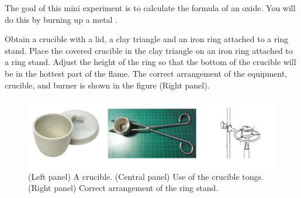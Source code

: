 \documentclass[main.tex]{subfiles}
\begin{document}
\begin{fullwidth}
\vspace{0.2cm}{\large \bfseries 1. Empirical formula of an oxyde}
The goal of this mini experiment is to calculate the formula of an oxide. You will do this by burning up a metal .
\begin{steps}
      \newstep[] Obtain a crucible with a lid, a clay triangle and an iron ring attached to a ring stand. Place the covered crucible in the clay triangle on an iron ring attached to a ring stand. Adjust the height of the ring so that the bottom of the crucible will be in the hottest part of the flame. The correct arrangement of the equipment, crucible, and burner is shown in the figure (Right panel).   
     


\begin{figure}[h] %
        \includegraphics[width=\linewidth,scale=0.3]{./chapter5/formu.png}
\caption{(Left panel) A crucible. (Central panel) Use of the crucible tongs. (Right panel) Correct arrangement of the ring stand.}\label{fig:reactions}
\end{figure}
\vspace{1cm}



\end{steps}
\end{fullwidth}
\end{document}
